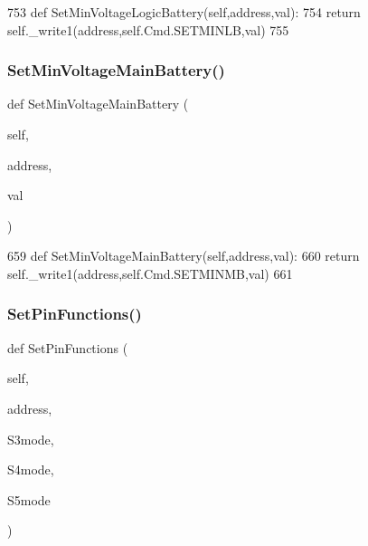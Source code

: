 \begin{DoxyCode}
753     \textcolor{keyword}{def }SetMinVoltageLogicBattery(self,address,val):
754         \textcolor{keywordflow}{return} self.\_write1(address,self.Cmd.SETMINLB,val)
755 
\end{DoxyCode}
\mbox{\label{classtoxic__hardware_1_1roboclaw__3_1_1Roboclaw_a7e011acf85a7b17384719def6997dde8}} 
\subsubsection{\texorpdfstring{Set\+Min\+Voltage\+Main\+Battery()}{SetMinVoltageMainBattery()}}
{\footnotesize\ttfamily def Set\+Min\+Voltage\+Main\+Battery (\begin{DoxyParamCaption}\item[{}]{self,  }\item[{}]{address,  }\item[{}]{val }\end{DoxyParamCaption})}


\begin{DoxyCode}
659     \textcolor{keyword}{def }SetMinVoltageMainBattery(self,address,val):
660         \textcolor{keywordflow}{return} self.\_write1(address,self.Cmd.SETMINMB,val)
661 
\end{DoxyCode}
\mbox{\label{classtoxic__hardware_1_1roboclaw__3_1_1Roboclaw_ac54b2cb80b2ab567fb290a6c376c07a7}} 
\subsubsection{\texorpdfstring{Set\+Pin\+Functions()}{SetPinFunctions()}}
{\footnotesize\ttfamily def Set\+Pin\+Functions (\begin{DoxyParamCaption}\item[{}]{self,  }\item[{}]{address,  }\item[{}]{S3mode,  }\item[{}]{S4mode,  }\item[{}]{S5mode }\end{DoxyParamCaption})}



